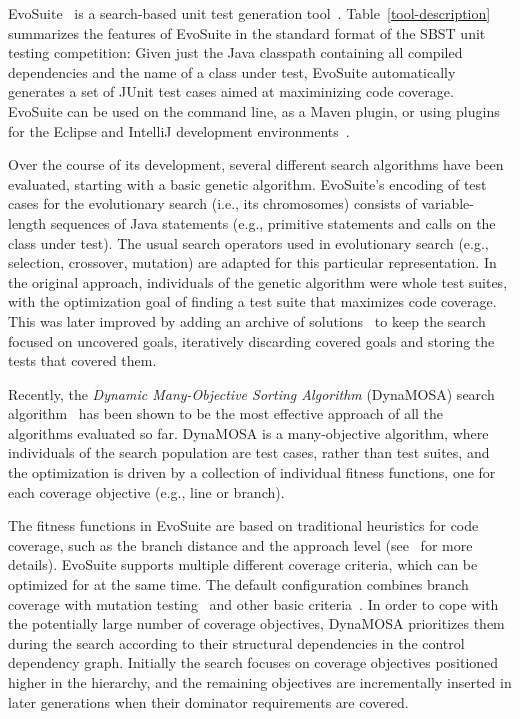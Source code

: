 \documentclass[sigconf]{acmart}
\newcommand{\EVOSUITE}{{\sc EvoSuite}\xspace}
\begin{document}
\EVOSUITE~\cite{FrA11c} is a search-based unit test generation
tool~\cite{GoA_TSE12}. Table~\ref{tool-description} summarizes the features of
\EVOSUITE in the standard format of the SBST unit testing competition: Given
just the Java classpath containing all compiled dependencies and the name of a
class under test, \EVOSUITE automatically generates a set of JUnit test cases
aimed at maximinizing code coverage. \EVOSUITE can be used on the command line,
as a Maven plugin, or using plugins for the Eclipse and IntelliJ development
environments~\cite{ICST16_Tool}.

Over the course of its development, several different search algorithms have
been evaluated, starting with a basic genetic algorithm. \EVOSUITE's encoding of test cases for the evolutionary search (i.e., its chromosomes) consists of variable-length sequences of Java statements (e.g., primitive statements and calls on the class under test). The usual search operators used in evolutionary search (e.g., selection, crossover, mutation) are adapted for this particular representation. 
%
In the original approach, individuals of the genetic algorithm were whole test
suites, with the optimization goal of finding a test suite that maximizes code
coverage. This was later improved by adding an archive of
solutions~\cite{emse_archive} to keep the search focused on uncovered goals,
iteratively discarding covered goals and storing the tests that covered them.

Recently, the \textit{Dynamic Many-Objective Sorting Algorithm} (DynaMOSA) search algorithm~\cite{dynamosa, panichella:ssbse2018}  has been shown to be the most effective approach of all the algorithms evaluated so far. DynaMOSA is a many-objective algorithm, where individuals of the search population are test cases, rather than test suites, and the optimization is driven by a collection of individual fitness functions, one for each coverage objective (e.g., line or branch).

The fitness functions in \EVOSUITE are based on traditional heuristics for code
coverage, such as the branch distance and the approach level
(see~\cite{GoA_TSE12} for more details).
%
\EVOSUITE supports multiple different coverage criteria, which can be optimized
for at the same time. The default configuration combines branch coverage with
mutation testing~\cite{emse14_mutation} and other basic
criteria~\cite{rojas2015combining}.
%
In order to cope with the potentially large number of coverage objectives,
DynaMOSA prioritizes them during the search according to their structural
dependencies in the control dependency graph. Initially the search focuses on
coverage objectives positioned higher in the hierarchy, and the remaining
objectives are incrementally inserted in later generations when their dominator
requirements are covered.
\end{document}
